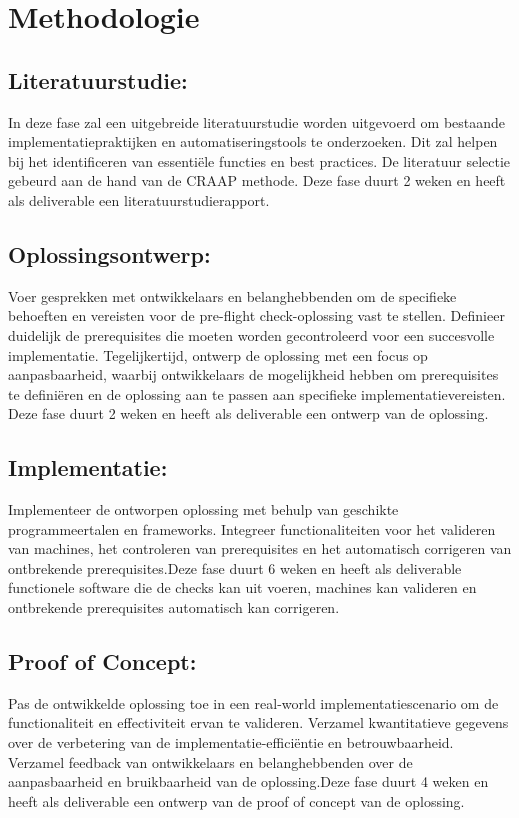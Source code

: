 \section{Methodologie}%
\label{sec:methodologie}
\subsection{Literatuurstudie:}
In deze fase zal een uitgebreide literatuurstudie worden uitgevoerd om bestaande implementatiepraktijken en automatiseringstools te onderzoeken. Dit zal helpen bij het identificeren van essentiële functies en best practices. De literatuur selectie gebeurd aan de hand van de CRAAP methode. Deze fase duurt 2 weken en heeft als deliverable een literatuurstudierapport.

\subsection{Oplossingsontwerp: }
Voer gesprekken met ontwikkelaars en belanghebbenden om de specifieke behoeften en vereisten voor de pre-flight check-oplossing vast te stellen. Definieer duidelijk de prerequisites die moeten worden gecontroleerd voor een succesvolle implementatie. Tegelijkertijd, ontwerp de oplossing met een focus op aanpasbaarheid, waarbij ontwikkelaars de mogelijkheid hebben om prerequisites te definiëren en de oplossing aan te passen aan specifieke implementatievereisten. Deze fase duurt 2 weken en heeft als deliverable een ontwerp van de oplossing.

\subsection{Implementatie:}
Implementeer de ontworpen oplossing met behulp van geschikte programmeertalen en frameworks. Integreer functionaliteiten voor het valideren van machines, het controleren van prerequisites en het automatisch corrigeren van ontbrekende prerequisites.Deze fase duurt 6 weken en heeft als deliverable functionele software die de checks kan uit voeren, machines kan valideren en ontbrekende prerequisites automatisch kan corrigeren.

\subsection{Proof of Concept:}
Pas de ontwikkelde oplossing toe in een real-world implementatiescenario om de functionaliteit en effectiviteit ervan te valideren. Verzamel kwantitatieve gegevens over de verbetering van de implementatie-efficiëntie en betrouwbaarheid. Verzamel feedback van ontwikkelaars en belanghebbenden over de aanpasbaarheid en bruikbaarheid van de oplossing.Deze fase duurt 4 weken en heeft als deliverable een ontwerp van de proof of concept van de oplossing.

